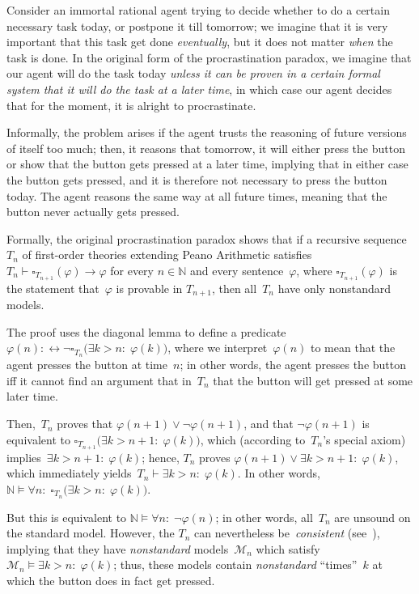 \documentclass[12pt]{article}
\newcommand{\NN}{\mathbb{N}}
\newcommand{\cM}{\mathcal{M}}
\theoremstyle{plain}
\theoremstyle{definition}
\theoremstyle{remark}
\begin{document}
Consider an immortal rational agent trying to decide whether to do a certain necessary task today, or postpone it till tomorrow; we imagine that it is very important that this task get done \emph{eventually}, but it does not matter \emph{when} the task is done. In the original form of the procrastination paradox, we imagine that our agent will do the task today \emph{unless it can be proven in a certain formal system that it will do the task at a later time}, in which case our agent decides that for the moment, it is alright to procrastinate.

Informally, the problem arises if the agent trusts the reasoning of future versions of itself too much; then, it reasons that tomorrow, it will either press the button or show that the button gets pressed at a later time, implying that in either case the button gets pressed, and it is therefore not necessary to press the button today. The agent reasons the same way at all future times, meaning that the button never actually gets pressed.

Formally, the original procrastination paradox shows that if a recursive sequence~$T_n$ of first-order theories extending Peano Arithmetic satisfies $T_n \vdash \square_{T_{n+1}}(\varphi)\to\varphi$ for every $n\in\NN$ and every sentence~$\varphi$, where $\square_{T_{n+1}}(\varphi)$ is the statement that~$\varphi$ is provable in $T_{n+1}$, then all~$T_n$ have only nonstandard models.

The proof uses the diagonal lemma to define a predicate~$\varphi(n) :\leftrightarrow \neg\square_{T_n}\big(\exists k>n{:}\;\varphi(k)\big)$, where we interpret~$\varphi(n)$ to mean that the agent presses the button at time~$n$; in other words, the agent presses the button iff it cannot find an argument that in~$T_n$ that the button will get pressed at some later time.

Then,~$T_n$ proves that $\varphi(n+1)\vee\neg\varphi(n+1)$, and that $\neg\varphi(n+1)$ is equivalent to $\square_{T_{n+1}}\big(\exists k>n+1{:}\;\varphi(k)\big)$, which (according to~$T_n$'s special axiom) implies~$\exists k>n+1{:}\;\varphi(k)$; hence, $T_n$ proves $\varphi(n+1)\vee\exists k>n+1{:}\;\varphi(k)$, which immediately yields~$T_n\vdash\exists k>n{:}\;\varphi(k)$. In other words, $\NN\vDash\forall n{:}\;\square_{T_n}\big(\exists k>n{:}\;\varphi(k)\big)$. 

But this is equivalent to $\NN\vDash\forall n{:}\;\neg\varphi(n)$; in other words, all~$T_n$ are unsound on the standard model. However, the $T_n$ can nevertheless be~\emph{consistent} (see~\cite{yudkowsky13}), implying that they have \emph{nonstandard} models~$\cM_n$ which satisfy $\cM_n\vDash\exists k>n{:}\;\varphi(k)$; thus, these models contain \emph{nonstandard} ``times''~$k$ at which the button does in fact get pressed.
\end{document}
